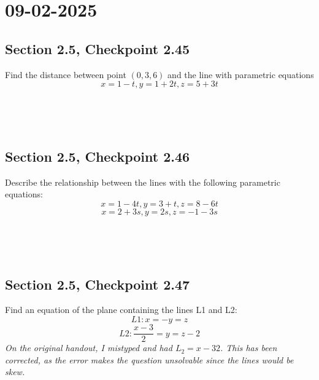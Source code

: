 \documentclass[]{mangos-musings}
\begin{document}
\newpage
\section{09-02-2025}
\subsection{Section 2.5, Checkpoint 2.45}
Find the distance between point $(0,3,6)$ and the line with parametric equations 
\[x=1-t,y=1+2t,z=5+3t\]
\begin{align*}
  \\ 
  \\ 
  \\ 
  \\
  \\
  \\
  \\
  \\
  \\
  \\
\end{align*}


\subsection{Section 2.5, Checkpoint 2.46}
Describe the relationship between the lines with the following parametric equations:
\[x=1-4t,y=3+t,z=8-6t\]
\[x=2+3s,y=2s,z=-1-3s\]
\begin{align*}
  \\ 
  \\ 
  \\
  \\
  \\
  \\
  \\ 
  \\
  \\
  \\
\end{align*}

\subsection{Section 2.5, Checkpoint 2.47}
Find an equation of the plane containing the lines L1 and L2:
\[L1:x=-y=z\]
\[L2:\frac{x-3}{2}=y=z-2\]
\textit{On the original handout, I mistyped and had $L_2 = x - 32$. This has been corrected, as the error makes the question unsolvable since the lines would be skew.}
\end{document}

